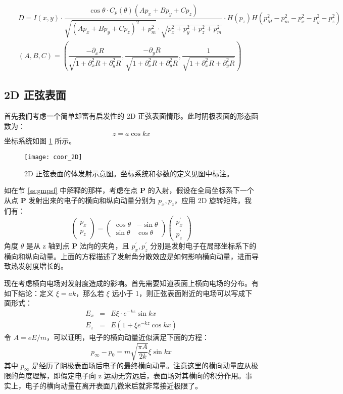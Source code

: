 \begin{eqnarray}
&&D = I(x,y)\cdot\dfrac{\cos\theta\cdot C_p(\theta)(Ap_x+Bp_y+Cp_z)}{\sqrt{(Ap_x+Bp_y+Cp_z)^2+p_m^2}\cdot\sqrt{p_x^2+p_y^2+p_z^2+p_m^2}}\cdot H(p_z)H(p_M^2-p_m^2-p_x^2-p_y^2-p_z^2)\label{eq:g-dist}\nonumber\\
&&(A, B, C) = \left(\dfrac{-\partial_xR}{\sqrt{1+\partial_x^2R+\partial_y^2R}},\dfrac{-\partial_yR}{\sqrt{1+\partial_x^2R+\partial_y^2R}},\dfrac{1}{\sqrt{1+\partial_x^2R+\partial_y^2R}}\right)
\end{eqnarray}

\subsection{\label{ss:2d}2D 正弦表面}
首先我们考虑一个简单却富有启发性的 2D 正弦表面情形。此时阴极表面的形态函数为：
\[
z = a\cos kx
\]
坐标系统如图 \ref{fig:coor_2D} 所示。

\begin{figure}[htbp]
\centering
\texttt{[image: coor\_2D]}
\caption{\label{fig:coor_2D} 2D 正弦表面的体发射示意图。坐标系统和参数的定义见图中标注。}
\end{figure}

如在节 \ref{ss:gmpsf} 中解释的那样，考虑在点 \textbf{P} 的入射，假设在全局坐标系下一个从点 \textbf{P} 发射出来的电子的横向和纵向动量分别为 $p_x, p_z$，应用 2D 旋转矩阵，我们有：
\[
\left(\begin{array}{c}
p_x\\
p_z
\end{array}\right)=
\left(\begin{array}{cc}
\cos\theta & -\sin\theta\\
\sin\theta & \cos\theta 
\end{array}\right)
\left(\begin{array}{c}
p_x^{\prime}\\
p_z^{\prime}
\end{array}\right)
\]
角度 $\theta$ 是从 z 轴到点 \textbf{P} 法向的夹角，且 $p_x^{\prime}, p_z^{\prime}$ 分别是发射电子在局部坐标系下的横向和纵向动量。上面的方程描述了发射角分散效应是如何影响横向动量，进而导致热发射度增长的。

现在考虑横向电场对发射度造成的影响。首先需要知道表面上横向电场的分布。有如下结论：定义 $\xi=ak$，那么若 $\xi$ 远小于 1，则正弦表面附近的电场可以写成下面形式：
\begin{eqnarray*}
E_x &=& E\xi\cdot e^{-kz}\sin kx \\
E_z &=& E\left(1+\xi e^{-kz}\cos kx\right)
\end{eqnarray*}
令 $A = eE/m$，可以证明，电子的横向动量近似满足下面的方程：
\[
p_{\infty}-p_0 = m\sqrt{\dfrac{\pi A}{2k}}\xi\sin kx
\]
其中 $p_{\infty}$ 是经历了阴极表面场后电子的最终横向动量。注意这里的横向动量应从极限的角度理解，即假定电子向 z 运动无穷远后，表面场对其横向的积分作用。事实上，电子的横向动量在离开表面几微米后就非常接近极限了。

